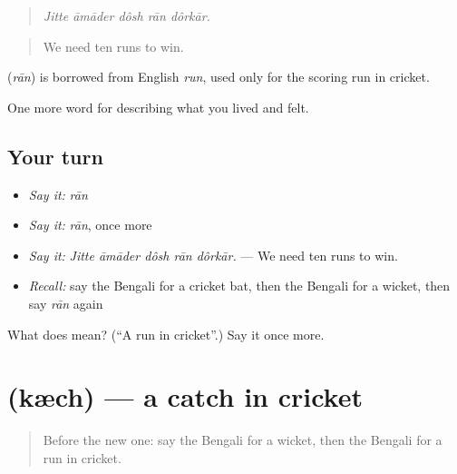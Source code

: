 \begin{quote}
    
\end{quote}

\begin{quote}
\emph{Jitte āmāder dôsh rān dôrkār.}
\end{quote}

\begin{quote}
We need ten runs to win.
\end{quote}

\begin{cousinweb}
\textbf{} (\emph{rān}) is borrowed from English \emph{run}, used only for the scoring run in cricket.
\end{cousinweb}

\begin{grammarlens}[title={What you've built}]
One more word for describing what you lived and felt.
\end{grammarlens}

\subsection*{Your turn}
\begin{itemize}
\raggedright
  \item \emph{Say it:} \emph{rān}
  \item \emph{Say it:} \emph{rān}, once more
  \item \emph{Say it:} \emph{Jitte āmāder dôsh rān dôrkār.} — We need ten runs to win.
  \item \emph{Recall:} say the Bengali for a cricket bat, then the Bengali for a wicket, then say \emph{rān} again
\end{itemize}

\begin{tcolorbox}[breakable,colback=teal!4,colframe=teal!35!black,title={Before you move on}]
What does  mean? (\textquotedblleft{}A run in cricket\textquotedblright{}.) Say it once more.
\end{tcolorbox}
\section[\texorpdfstring{\bn{ক্যাচ} (kæch)}{ক্যাচ (kæch)}]{ (kæch) — a catch in cricket}

\label{lesson:BN-C521-kech}



\begin{quote}
Before the new one: say the Bengali for a wicket, then the Bengali for a run in cricket.
\end{quote}

